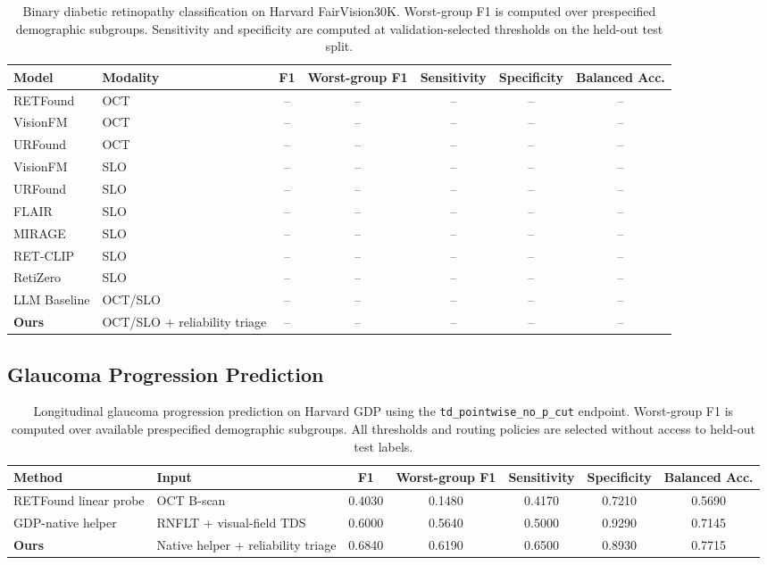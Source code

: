 \begin{table}[t]
\centering
\caption{Binary diabetic retinopathy classification on Harvard FairVision30K.
Worst-group F1 is computed over prespecified demographic subgroups.
Sensitivity and specificity are computed at validation-selected thresholds on
the held-out test split.}
\label{tab:dr_fairvision30k}
\begin{tabular}{@{}llccccc@{}}
\toprule
\textbf{Model} & \textbf{Modality} & \textbf{F1} &
\textbf{Worst-group F1} & \textbf{Sensitivity} &
\textbf{Specificity} & \textbf{Balanced Acc.} \\
\midrule
RETFound & OCT & -- & -- & -- & -- & -- \\
VisionFM & OCT & -- & -- & -- & -- & -- \\
URFound & OCT & -- & -- & -- & -- & -- \\
VisionFM & SLO & -- & -- & -- & -- & -- \\
URFound & SLO & -- & -- & -- & -- & -- \\
FLAIR & SLO & -- & -- & -- & -- & -- \\
MIRAGE & SLO & -- & -- & -- & -- & -- \\
RET-CLIP & SLO & -- & -- & -- & -- & -- \\
RetiZero & SLO & -- & -- & -- & -- & -- \\
LLM Baseline & OCT/SLO & -- & -- & -- & -- & -- \\
\textbf{Ours} & OCT/SLO + reliability triage & -- & -- & -- & -- & -- \\
\bottomrule
\end{tabular}
\end{table}

\subsection{Glaucoma Progression Prediction}

\begin{table}[t]
\centering
\caption{Longitudinal glaucoma progression prediction on Harvard GDP using the
\texttt{td\_pointwise\_no\_p\_cut} endpoint. Worst-group F1 is computed over
available prespecified demographic subgroups. All thresholds and routing
policies are selected without access to held-out test labels.}
\label{tab:gdp_progression_prediction}
\begin{tabular}{@{}llccccc@{}}
\toprule
\textbf{Method} & \textbf{Input} & \textbf{F1} &
\textbf{Worst-group F1} & \textbf{Sensitivity} &
\textbf{Specificity} & \textbf{Balanced Acc.} \\
\midrule
RETFound linear probe & OCT B-scan & 0.4030 & 0.1480 & 0.4170 & 0.7210 & 0.5690 \\
GDP-native helper & RNFLT + visual-field TDS & 0.6000 & 0.5640 & 0.5000 & 0.9290 & 0.7145 \\
\textbf{Ours} & Native helper + reliability triage & 0.6840 & 0.6190 & 0.6500 & 0.8930 & 0.7715 \\
\bottomrule
\end{tabular}
\end{table}

